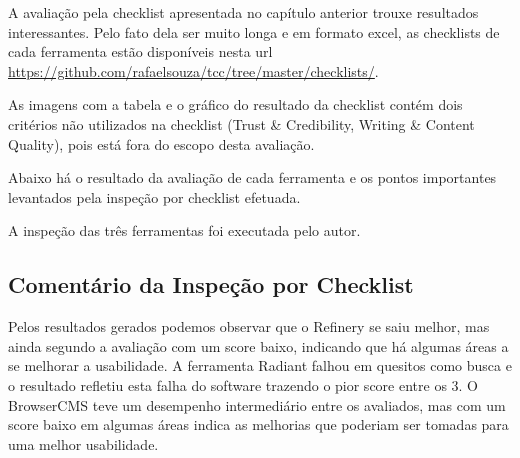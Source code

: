 A avaliação pela checklist apresentada no capítulo anterior trouxe resultados interessantes. Pelo fato dela ser muito longa e em formato excel, as checklists de cada ferramenta estão disponíveis nesta url \url{https://github.com/rafaelsouza/tcc/tree/master/checklists/}. 

As imagens com a tabela e o gráfico do resultado da checklist contém dois critérios não utilizados na checklist (Trust \& Credibility, Writing \& Content Quality), pois está fora do escopo desta avaliação.

Abaixo há o resultado da avaliação de cada ferramenta e os pontos importantes levantados pela inspeção por checklist efetuada. 

A inspeção das três ferramentas foi executada pelo autor.





\subsection{Comentário da Inspeção por Checklist}

Pelos resultados gerados podemos observar que o Refinery se saiu melhor, mas ainda segundo a avaliação com um score baixo, indicando que há algumas áreas a se melhorar a usabilidade. A ferramenta Radiant falhou em quesitos como busca e o resultado refletiu esta falha do software trazendo o pior score entre os 3. O BrowserCMS teve um desempenho intermediário entre os avaliados, mas com um score baixo em algumas áreas indica as melhorias que poderiam ser tomadas para uma melhor usabilidade.   

